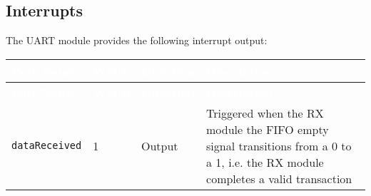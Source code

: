 \subsection{Interrupts}

The UART module provides the following interrupt output:

\renewcommand*{\arraystretch}{1.3}
\begingroup
\small
{}
\begin{longtable}[H]{
  | p{}
  | p{}
  | p{}
  | p{} |
}
\hline
\rowcolor{gray}
\textcolor{white}{\textbf{Port Name}} &
\textcolor{white}{\textbf{Width}} &
\textcolor{white}{\textbf{Direction}} &
\textcolor{white}{\textbf{Description}} \\ \hline
\endfirsthead

\hline
\rowcolor{gray}
\textcolor{white}{\textbf{Port Name}} &
\textcolor{white}{\textbf{Width}} &
\textcolor{white}{\textbf{Direction}} &
\textcolor{white}{\textbf{Description}}\\ \hline
\endhead

\hline
\endfoot

\texttt{dataReceived} &
1 &
Output &
Triggered when the RX module the FIFO empty signal transitions from a 0 to a 1, i.e. the RX module completes a valid transaction  \\ \hline

\end{longtable}
\label{table:apb_ports}
\endgroup